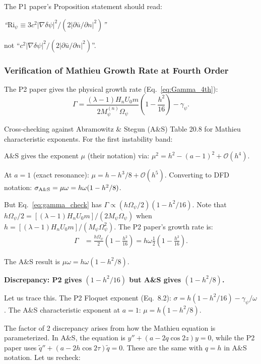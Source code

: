 \documentclass[11pt,twocolumn]{article}
\newcommand{\dpsi}{\delta\psi}
\newcommand{\lam}{\lambda}
\newcommand{\Opsi}{\Omega_\psi}
\newcommand{\gpsi}{\gamma_\psi}
\newcommand{\Mpsi}{M_\psi}
\newcommand{\order}[1]{\mathcal{O}(#1)}
\newcommand{\Ri}{\mathrm{Ri}}
\begin{document}
The P1 paper's Proposition statement should read:
\begin{center}
\emph{``$\Ri_\psi \equiv 3c^2|\nabla\dpsi|^2 / (2|\partial\bar{u}/\partial n|^2)$''}
\end{center}
not ``$c^2|\nabla\dpsi|^2/(2|\partial\bar{u}/\partial n|^2)$''.

\subsubsection{Verification of Mathieu Growth Rate at Fourth Order}

The P2 paper gives the physical growth rate (Eq.~\ref{eq:Gamma_4th}):
\begin{equation}
\Gamma = \frac{(\lambda-1)H_n U_0 m}{2\Mpsi^{(n)}\Opsi}
\left(1 - \frac{h^2}{16}\right) - \gpsi.
\label{eq:gamma_check}
\end{equation}

Cross-checking against Abramowitz \& Stegun (A\&S) Table 20.8 for Mathieu
characteristic exponents. For the first instability band:

A\&S gives the exponent $\mu$ (their notation) via:
$\mu^2 = h^2 - (a-1)^2 + \order{h^4}$.

At $a = 1$ (exact resonance): $\mu = h - h^3/8 + \order{h^5}$.
Converting to DFD notation: $\sigma_{\rm A\&S} = \mu\omega = h\omega
(1 - h^2/8)$.

But Eq.~\eqref{eq:gamma_check} has $\Gamma \propto (h\Opsi/2)(1 - h^2/16)$.
Note that $h\Opsi/2 = [(\lam-1)H_n U_0 m]/(2\Mpsi\Opsi)$ when
$h = [(\lam-1)H_n U_0 m]/(\Mpsi\Opsi^2)$. The P2 paper's growth rate is:
\begin{align}
\Gamma &= \frac{h\Opsi}{2}\left(1 - \frac{h^2}{16}\right)
= h\omega\frac{1}{2}\left(1 - \frac{h^2}{16}\right).
\end{align}

The A\&S result is $\mu\omega = h\omega(1 - h^2/8)$.

\textbf{Discrepancy: P2 gives $(1 - h^2/16)$ but A\&S gives $(1 - h^2/8)$.}

Let us trace this. The P2 Floquet exponent (Eq.~8.2):
$\sigma = h(1 - h^2/16) - \gpsi/\omega$.
The A\&S characteristic exponent at $a = 1$: $\mu = h(1 - h^2/8)$.

The factor of 2 discrepancy arises from how the Mathieu equation is
parameterized. In A\&S, the equation is $y'' + (a - 2q\cos 2z)y = 0$,
while the P2 paper uses $\tilde{q}'' + (a - 2h\cos 2\tau)\tilde{q} = 0$.
These are the same with $q = h$ in A\&S notation. Let us recheck:
\end{document}

